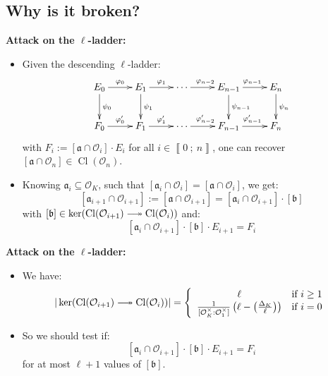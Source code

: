 \documentclass[10pt]{beamer}
\theoremstyle{plain}
\theoremstyle{definition}
\newcommand{\mO}{\mathcal{O}}
\renewcommand{\i}[2]{\left\llbracket #1~;~#2\right\rrbracket}
\renewcommand{\(}{\left(}
\renewcommand{\)}{\right)}
\newcommand{\mf}[1]{\mathfrak{#1}}
\DeclareMathOperator{\Cl}{Cl}
\begin{document}
\subsection{Why is it broken?}

\begin{frame}
\textbf{Attack on the $\ell$-ladder:}

\vspace{0.5cm}

\begin{itemize}
\item Given the descending $\ell$-ladder:
\[\xymatrix{
E_0 \ar[d]^{\psi_0} \ar[r]^{\varphi_0} & E_1\ar[d]^{\psi_1} \ar[r]^{\varphi_{1}}& \cdots \ar[r]^{\varphi_{n-2}} & E_{n-1} \ar[d]^{\psi_{n-1}} \ar[r]^{\varphi_{n-1}} & E_n \ar[d]^{\psi_n}\\
F_0 \ar[r]^{\varphi'_0} & F_1 \ar[r]^{\varphi'_{1}}& \cdots \ar[r]^{\varphi'_{n-2}} & F_{n-1} \ar[r]^{\varphi'_{n-1}} & F_n
}\]
with $F_i:=[\mf{a}\cap \mO_i]\cdot E_i$ for all $i\in\i{0}{n}$, one can recover $[\mf{a}\cap \mO_n]\in\Cl(\mO_n)$.

\item Knowing $\mf{a}_i\subseteq \mO_K$, such that $[\mf{a}_i\cap\mO_i]=[\mf{a}\cap \mO_i]$, we get:
\[[\mf{a}_{i+1}\cap\mO_{i+1}]:=[\mf{a}\cap \mO_{i+1}]=[\mf{a}_i\cap\mO_{i+1}]\cdot[\mf{b}]\]
with $[\mf{b}]\in\ker(\Cl(\mO_{i+1})\relbar\joinrel\twoheadrightarrow\Cl(\mO_{i}))$ and:
\[[\mf{a}_i\cap\mO_{i+1}]\cdot[\mf{b}]\cdot E_{i+1}=F_i\]
\end{itemize}

\end{frame}

\begin{frame}

\textbf{Attack on the $\ell$-ladder:}

\vspace{0.5cm}


\begin{itemize}
\item We have:
\[|\ker(\Cl(\mO_{i+1})\relbar\joinrel\twoheadrightarrow\Cl(\mO_{i}))|=\left\{ \begin{array}{cc} 
\ell & \mbox{if } i\geq 1\\
\frac{1}{[\mO_K^\times:\mO_1^\times]}\(\ell-\(\frac{\Delta_K}{\ell}\)\) & \mbox{if } i=0
\end{array}\right.\]

\item So we should test if:
\[[\mf{a}_i\cap\mO_{i+1}]\cdot[\mf{b}]\cdot E_{i+1}=F_i\]
for at most $\ell+1$ values of $[\mf{b}]$.
\end{itemize}


\end{frame}
\end{document}
